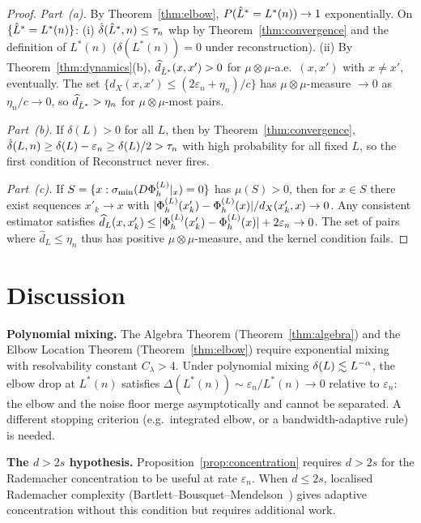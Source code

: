 \begin{proof}
\emph{Part~(a).}
By Theorem~\ref{thm:elbow}, $P(\hat{L}^* = L^*(n)) \to 1$ exponentially.
On $\{\hat{L}^* = L^*(n)\}$:
(i) $\hat{\delta}(\hat{L}^*,n) \leq \tau_n$ whp by Theorem~\ref{thm:convergence}
and the definition of $L^*(n)$ ($\delta(L^*(n)) = 0$ under reconstruction).
(ii) By Theorem~\ref{thm:dynamics}(b), $\widehat{d}_{\hat{L}^*}(x,x') > 0$
for $\mu \otimes \mu$-a.e.\ $(x,x')$ with $x \neq x'$, eventually.
The set $\{d_X(x,x') \leq (2\varepsilon_n + \eta_n)/c\}$ has
$\mu \otimes \mu$-measure $\to 0$ as $\eta_n/c \to 0$, so
$\widehat{d}_{\hat{L}^*} > \eta_n$ for $\mu\otimes\mu$-most pairs.

\emph{Part~(b).}
If $\delta(L) > 0$ for all $L$, then by Theorem~\ref{thm:convergence},
$\hat{\delta}(L,n) \geq \delta(L) - \varepsilon_n \geq \delta(L)/2 > \tau_n$
with high probability for all fixed $L$, so the first condition of
$\mathrm{Reconstruct}$ never fires.

\emph{Part~(c).}
If $S = \{x : \sigma_{\min}(D\Phi_h^{(L)}|_x) = 0\}$ has $\mu(S) > 0$,
then for $x \in S$ there exist sequences $x'_k \to x$ with
$|\Phi_h^{(L)}(x'_k) - \Phi_h^{(L)}(x)| / d_X(x'_k, x) \to 0$.
Any consistent estimator satisfies
$\widehat{d}_L(x, x'_k) \leq |\Phi_h^{(L)}(x'_k) - \Phi_h^{(L)}(x)| + 2\varepsilon_n \to 0$.
The set of pairs where $\widehat{d}_L \leq \eta_n$ thus has positive
$\mu \otimes \mu$-measure, and the kernel condition fails.
\end{proof}

\section{Discussion}
\label{sec:discussion}

\textbf{Polynomial mixing.}
The Algebra Theorem (Theorem~\ref{thm:algebra}) and the Elbow Location Theorem
(Theorem~\ref{thm:elbow}) require exponential mixing with resolvability constant
$C_\lambda > 4$.
Under polynomial mixing $\delta(L) \lesssim L^{-\alpha}$, the elbow drop at
$L^*(n)$ satisfies $\Delta(L^*(n)) \sim \varepsilon_n / L^*(n) \to 0$ relative
to $\varepsilon_n$: the elbow and the noise floor merge asymptotically and
cannot be separated.
A different stopping criterion (e.g.\ integrated elbow, or a bandwidth-adaptive
rule) is needed.

\textbf{The $d > 2s$ hypothesis.}
Proposition~\ref{prop:concentration} requires $d > 2s$ for the Rademacher
concentration to be useful at rate $\varepsilon_n$.
When $d \leq 2s$, localised Rademacher complexity
(Bartlett--Bousquet--Mendelson~\cite{BartlettBousquetMendelson2005})
gives adaptive concentration without this condition but requires additional
work.

